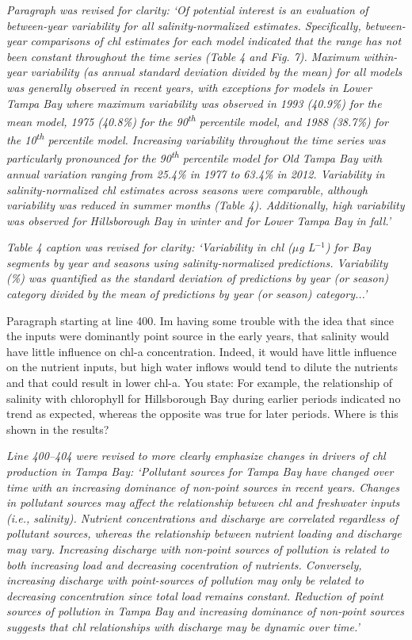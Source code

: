 \documentclass[letterpaper,12pt,oneside]{article}\usepackage[]{graphicx}\usepackage[]{color}
\newcommand{\mugl}{$\mu$g L$^{-1}$}
\newcommand{\nine}{90\textsuperscript{th} percentile }
\newcommand{\ten}{10\textsuperscript{th} percentile }
\begin{document}
\textit{Paragraph was revised for clarity: `Of potential interest is an evaluation of between-year variability for all salinity-normalized estimates.  Specifically, between-year comparisons of \ac{chl} estimates for each model indicated that the range has not been constant throughout the time series (Table 4 and Fig. 7).  Maximum within-year variability (as annual standard deviation divided by the mean) for all models was generally observed in recent years, with exceptions for models in Lower Tampa Bay where maximum variability was observed in 1993 (40.9\%) for the mean model, 1975 (40.8\%) for the \nine model, and 1988 (38.7\%) for the \ten model.  Increasing variability throughout the time series was particularly pronounced for the \nine model for Old Tampa Bay with annual variation ranging from 25.4\% in 1977  to 63.4\% in 2012.  Variability in salinity-normalized \ac{chl} estimates across seasons were comparable, although variability was reduced in summer months (Table 4).  Additionally, high variability was observed for Hillsborough Bay in winter and for Lower Tampa Bay in fall.'}

\textit{Table 4 caption was revised for clarity: `Variability in \ac{chl} (\mugl) for Bay segments by year and seasons using salinity-normalized predictions.  Variability (\%) was quantified as the standard deviation of predictions by year (or season) category divided by the mean of predictions by year (or season) category...'}

Paragraph starting at line 400.  Im having some trouble with the idea that since the inputs were dominantly point source in the early years, that salinity would have little influence on chl-a concentration.  Indeed, it would have little influence on the nutrient inputs, but high water inflows would tend to dilute the nutrients and that could result in lower chl-a.  You state: For example, the relationship of salinity with chlorophyll for Hillsborough Bay during earlier periods indicated no trend as expected, whereas the opposite was true for later periods.  Where is this shown in the results? 

\textit{Line 400--404 were revised to more clearly emphasize changes in drivers of \ac{chl} production in Tampa Bay: `Pollutant sources for Tampa Bay have changed over time with an increasing dominance of non-point sources in recent years.  Changes in pollutant sources may affect the relationship between \ac{chl} and freshwater inputs (i.e., salinity).  Nutrient concentrations and discharge are correlated regardless of pollutant sources, whereas the relationship between nutrient loading and discharge may vary.  Increasing discharge with non-point sources of pollution is related to both increasing load and decreasing cocentration of nutrients.  Conversely, increasing discharge with point-sources of pollution may only be related to decreasing concentration since total load remains constant. Reduction of point sources of pollution in Tampa Bay and increasing dominance of non-point sources suggests that \ac{chl} relationships with discharge may be dynamic over time.'}
\end{document}
